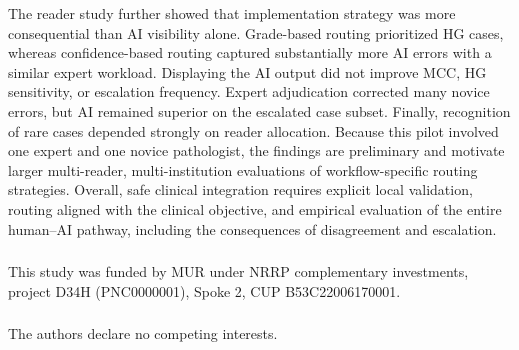 \documentclass[runningheads]{llncs}
\begin{document}
The reader study further showed that implementation strategy was more
consequential than AI visibility alone. Grade-based routing prioritized HG cases,
whereas confidence-based routing captured substantially more AI errors with a
similar expert workload. Displaying the AI output did not improve MCC, HG
sensitivity, or escalation frequency. Expert adjudication corrected many novice
errors, but AI remained superior on the escalated case subset. Finally,
recognition of rare cases depended strongly on reader allocation. 
Because this pilot involved one expert and one novice pathologist, the findings
are preliminary and motivate larger multi-reader, multi-institution evaluations
of workflow-specific routing strategies. Overall,
safe clinical integration requires explicit local validation, routing aligned
with the clinical objective, and empirical evaluation of the entire human--AI
pathway, including the consequences of disagreement and escalation.

    

\begin{credits}
\subsubsection{\ackname} This study was funded by MUR under NRRP complementary investments, project D34H (PNC0000001), Spoke 2, CUP B53C22006170001.

\subsubsection{\discintname} The authors declare no competing interests.
\end{credits}

%
%
%


\end{document}
